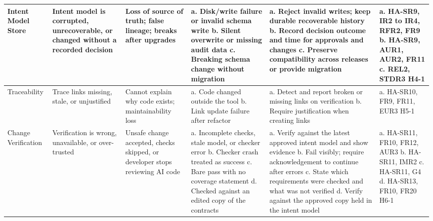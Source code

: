 \documentclass{article}
\begin{document}
\begin{landscape}
\begin{small}
\begin{longtable}{|p{2.1cm}|p{2.4cm}|p{2.8cm}|p{3.2cm}|p{3.6cm}|p{2.4cm}|}
Intent Model Store &
Intent model is corrupted, unrecoverable, or changed without a recorded
decision &
Loss of source of truth; false lineage; breaks after upgrades &
a. Disk/write failure or invalid schema write\newline
b. Silent overwrite or missing audit data\newline
c. Breaking schema change without migration &
a. Reject invalid writes; keep durable recoverable history\newline
b. Record decision outcome and time for approvals and changes\newline
c. Preserve compatibility across releases or provide migration &
a. HA-SR9, IR2 to IR4, RFR2, FR9\newline
b. HA-SR9, AUR1, AUR2, FR11\newline
c. REL2, STDR3\newline
H4-1 \\
\hline

Traceability &
Trace links missing, stale, or unjustified &
Cannot explain why code exists; maintainability loss &
a. Code changed outside the tool\newline
b. Link update failure after refactor &
a. Detect and report broken or missing links on verification\newline
b. Require justification when creating links &
a. HA-SR10, FR9, FR11, EUR3\newline
H5-1 \\
\hline

Change Verification &
Verification is wrong, unavailable, or over-trusted &
Unsafe change accepted, checks skipped, or developer stops reviewing AI code &
a. Incomplete checks, stale model, or checker error\newline
b. Checker crash treated as success\newline
c. Bare pass with no coverage statement\newline
d. Checked against an edited copy of the contracts &
a. Verify against the latest approved intent model and show evidence\newline
b. Fail visibly; require acknowledgement to continue after errors\newline
c. State which requirements were checked and what was not verified\newline
d. Verify against the approved copy held in the intent model &
a. HA-SR11, FR10, FR12, AUR3\newline
b. HA-SR11, IMR2\newline
c. HA-SR11, G4\newline
d. HA-SR13, FR10, FR20\newline
H6-1 \\
\hline


\end{longtable}
\end{small}
\end{landscape}
\end{document}
